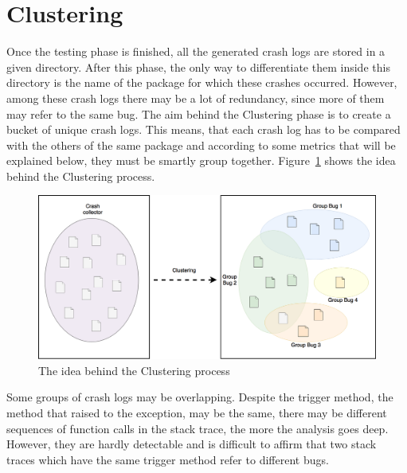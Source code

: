 \section{Clustering}
Once the testing phase is finished, all the generated crash logs are stored in a given directory. After this phase, the only way to differentiate them inside this directory is the name of the package for which these crashes occurred. However, among these crash logs there may be a lot of redundancy, since more of them may refer to the same bug. The aim behind the Clustering phase is to create a bucket of unique crash logs. This means, that each crash log has to be compared with the others	 of the same package and according to some metrics that will be explained below, they must be smartly group together. Figure~\ref{fig: clustering} shows the idea behind the Clustering process. 
\begin{figure}[htb]
\centering 
\includegraphics[width=\columnwidth]{imgs/clusteringidea} 
\caption{The idea behind the Clustering process}
\label{fig: clustering}
\end{figure}

Some groups of crash logs may be overlapping. Despite the trigger method, \ie the method that raised to the exception, may be the same, there may be different sequences of function calls in the stack trace, the more the analysis goes deep. However, they are hardly detectable and is difficult to affirm that two stack traces which have the same trigger method refer to different bugs. 

